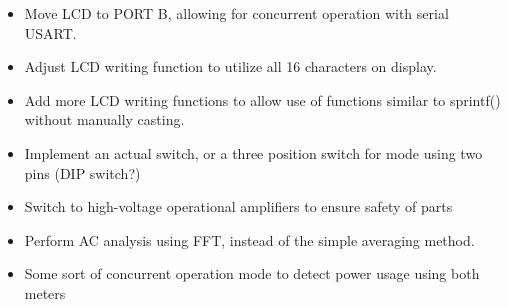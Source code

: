 \documentclass[11pt]{article}	%
\begin{document}
\begin{itemize}
\item Move LCD to PORT B, allowing for concurrent operation with serial USART.
\item Adjust LCD writing function to utilize all 16 characters on display.
\item Add more LCD writing functions to allow use of functions similar to sprintf() without manually casting.
\item Implement an actual switch, or a three position switch for mode using two pins (DIP switch?)
\item Switch to high-voltage operational amplifiers to ensure safety of parts
\item Perform AC analysis using FFT, instead of the simple averaging method.
\item Some sort of concurrent operation mode to detect power usage using both meters
\end{itemize}
\end{document}

